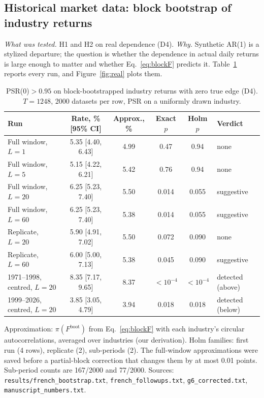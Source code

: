 \documentclass[11pt,a4paper]{article}
\theoremstyle{remark}
\begin{document}
\subsection{Historical market data: block bootstrap of industry returns}\label{sec:res:real}

\emph{What was tested.} H1 and H2 on real dependence (D4). \emph{Why.} Synthetic AR(1) is a stylized departure; the question is whether the dependence in actual daily returns is large enough to matter and whether Eq.~\eqref{eq:blockF} predicts it. Table~\ref{tab:real} reports every run, and Figure~\ref{fig:real} plots them.

\begin{table}[t]
\centering\small
\begin{threeparttable}
\caption{PSR(0)$>0.95$ on block-bootstrapped industry returns with zero true edge (D4). $T=1248$, 2000 datasets per row, PSR on a uniformly drawn industry.}\label{tab:real}
\begin{tabular}{@{}lccccl@{}}
\toprule
Run & Rate, \% [95\% CI] & Approx., \% & Exact $p$ & Holm $p$ & Verdict \\
\midrule
Full window, $L=1$ & 5.35 [4.40, 6.43] & 4.99 & 0.47 & 0.94 & none \\
Full window, $L=5$ & 5.15 [4.22, 6.21] & 5.42 & 0.76 & 0.94 & none \\
Full window, $L=20$ & 6.25 [5.23, 7.40] & 5.50 & 0.014 & 0.055 & suggestive \\
Full window, $L=60$ & 6.25 [5.23, 7.40] & 5.38 & 0.014 & 0.055 & suggestive \\
Replicate, $L=20$ & 5.90 [4.91, 7.02] & 5.50 & 0.072 & 0.090 & none \\
Replicate, $L=60$ & 6.00 [5.00, 7.13] & 5.38 & 0.045 & 0.090 & suggestive \\
\midrule
1971--1998, centred, $L=20$ & 8.35 [7.17, 9.65] & 8.37 & $<10^{-4}$ & $<10^{-4}$ & detected (above) \\
1999--2026, centred, $L=20$ & 3.85 [3.05, 4.79] & 3.94 & 0.018 & 0.018 & detected (below) \\
\bottomrule
\end{tabular}
\begin{tablenotes}\footnotesize
\item Approximation: $\pi(F^{\mathrm{boot}})$ from Eq.~\eqref{eq:blockF} with each industry's circular autocorrelations, averaged over industries (our derivation). Holm families: first run (4 rows), replicate (2), sub-periods (2). The full-window approximations were saved before a partial-block correction that changes them by at most 0.01 points. Sub-period counts are 167/2000 and 77/2000. Sources: \texttt{results/french\_bootstrap.txt}, \texttt{french\_followups.txt}, \texttt{g6\_corrected.txt}, \texttt{manuscript\_numbers.txt}.
\end{tablenotes}
\end{threeparttable}
\end{table}
\end{document}
